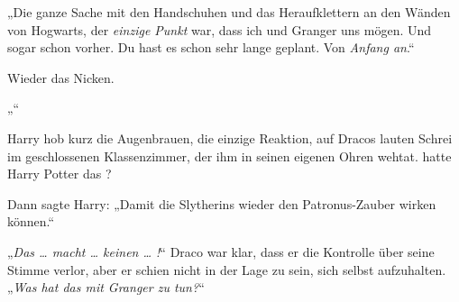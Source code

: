 „Die ganze Sache mit den Handschuhen und das Heraufklettern an den Wänden von Hogwarts, der \emph{einzige Punkt} war, dass ich und Granger uns mögen. Und sogar schon vorher. Du hast es schon sehr lange geplant. Von \emph{Anfang an}.“

Wieder das Nicken.

„“

Harry hob kurz die Augenbrauen, die einzige Reaktion, auf Dracos lauten Schrei im geschlossenen Klassenzimmer, der ihm in seinen eigenen Ohren wehtat.  hatte Harry Potter das ?

Dann sagte Harry:
„Damit die Slytherins wieder den Patronus-Zauber wirken können.“

„\emph{Das … macht … keinen … !}“ Draco war klar, dass er die Kontrolle über seine Stimme verlor, aber er schien nicht in der Lage zu sein, sich selbst aufzuhalten.
„\emph{Was hat das mit Granger zu tun?}“

